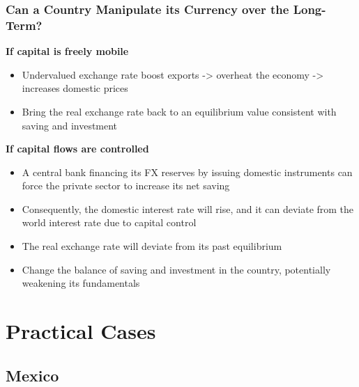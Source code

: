 \documentclass{beamer}
\newenvironment{wideitemize}{\itemize\addtolength{\itemsep}{10pt}}{\enditemize}
\begin{document}
\begin{frame}
  \frametitle{Can a Country Manipulate its Currency over the Long-Term?}
  \begin{wideitemize}
  \item \textbf{If capital is freely mobile}
    \begin{itemize}
      \item Undervalued exchange rate boost exports -> overheat the economy -> increases domestic prices
      \item Bring the real exchange rate back to an equilibrium value consistent with saving and investment
      \end{itemize}
    \item \textbf{If capital flows are controlled}
      \begin{itemize}
      \item A central bank financing its FX reserves by issuing domestic instruments can force the private sector to increase its net saving
      \item Consequently, the domestic interest rate will rise, and it can deviate from the world interest rate due to capital control
      \item The real exchange rate will deviate from its past equilibrium
      \item Change the balance of saving and investment in the country, potentially weakening its fundamentals
      \end{itemize}
  \end{wideitemize}
\end{frame}


\section{Practical Cases}

\subsection{Mexico}
\end{document}
